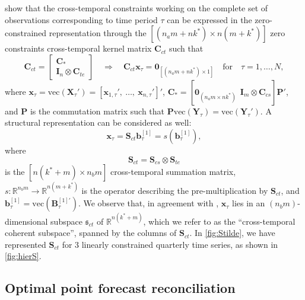 \documentclass[a4paper,11pt]{article}
\newcommand{\bvet}{\bm{b}}
\newcommand{\xvet}{\bm{x}}
\newcommand{\Bvet}{\bm{B}}
\newcommand{\Cvet}{\bm{C}}
\newcommand{\Ivet}{\bm{I}}
\newcommand{\Pvet}{\bm{P}}
\newcommand{\Svet}{\bm{S}}
\newcommand{\Xvet}{\bm{X}}
\newcommand{\Yvet}{\bm{Y}}
\newcommand{\Zerovet}{\bm{0}}
\theoremstyle{definition}
\begin{document}
\cite{difonzo2023} show that the cross-temporal constraints working on the complete set of observations corresponding to time period $\tau$ can be expressed in the zero-constrained representation through the $\left[(n_am+nk^\ast)\times n(m+k^\ast)\right]$ zero constraints cross-temporal kernel matrix $\Cvet_{ct}$ such that
\begin{equation}
	\label{eq:Cct}
	\Cvet_{ct} = \begin{bmatrix}
		\Cvet_\ast \\
		\Ivet_n \otimes \Cvet_{te}
	\end{bmatrix} \quad \Longrightarrow \quad
	\Cvet_{ct} \xvet_{\tau} = \Zerovet_{[(n_am+nk^\ast)\times1]} \quad \mathrm{for} \quad \tau = 1,\dots,N,
\end{equation}
where
$\xvet_{\tau} = \mathrm{vec}(\Xvet_{\tau}') = [\xvet_{1, \tau}',~ 	\dots, ~ \xvet_{n, \tau}']'$, $\Cvet_\ast = [\Zerovet_{(n_a m\times nk^\ast)} ~~ \Ivet_m \otimes \Cvet_{cs}]\Pvet'$, and $\Pvet$ is the commutation matrix \citep[][p.54]{magnus2019} such that $\Pvet \mathrm{vec}(\Yvet_{\tau}) = \mathrm{vec}(\Yvet_{\tau}')$. A structural representation can be considered as well:
$$
	\xvet_\tau = \Svet_{ct}\bvet^{[1]}_\tau = s(\bvet_{\tau}^{[1]}),
$$
where
\begin{equation}
	\label{eq:Sct}
	\Svet_{ct} = \Svet_{cs} \otimes \Svet_{te}
\end{equation}
is the $\left[n(k^\ast+m)\times n_b m\right]$ cross-temporal summation matrix, $s: \mathbb{R}^{n_b m} \rightarrow \mathbb{R}^{n(m+k^\ast)}$ is the operator describing the pre-multiplication by $\Svet_{ct}$, and $\bvet^{[1]}_\tau = \mathrm{vec}(\Bvet^{[1]\prime}_{\tau})$. We observe that, in agreement with \cite{panagiotelis2021}, $\xvet_{\tau}$ lies in an $(n_b m)$-dimensional subspace $\mathfrak{s}_{ct}$ of $\mathbb{R}^{n(k^\ast+m)}$, which we refer to as the “cross-temporal coherent subspace”, spanned by the columns of $\Svet_{ct}$.
In \autoref{fig:Stilde}, we have represented $\Svet_{ct}$ for 3 linearly constrained quarterly time series, as shown in \autoref{fig:hierS}.


\subsection{Optimal point forecast reconciliation}\label{ssec:oct}
\end{document}
